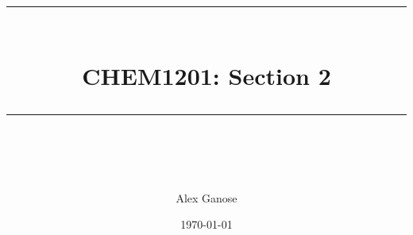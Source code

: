 \newcommand{\horrule}[1]{\rule{\linewidth}{#1}} %
\title{
  \normalfont \normalsize
  \horrule{0.5pt} \\[0.4cm]
  \huge CHEM1201: Section 2 \\
  \horrule{2pt} \\[0.5cm]
}

\author{Alex Ganose}
\date{\normalsize\today}